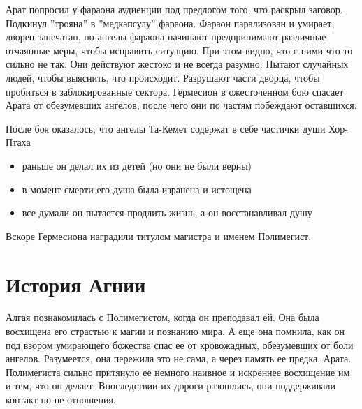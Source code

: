 \documentclass[12pt,a4paper]{article}
\begin{document}

Арат попросил у фараона аудиенции под предлогом того, что раскрыл заговор. Подкинул ''трояна'' в ''медкапсулу'' фараона. Фараон парализован и умирает, дворец запечатан, но ангелы фараона начинают предпринимают различные отчаянные меры, чтобы исправить ситуацию. При этом видно, что с ними что-то сильно не так. Они действуют жестоко и не всегда разумно. Пытают случайных людей, чтобы выяснить, что происходит. Разрушают части дворца, чтобы пробиться в заблокированные сектора. Гермесион в ожесточенном бою спасает Арата от обезумевших ангелов, после чего они по частям побеждают оставшихся.

После боя оказалось, что ангелы Та-Кемет содержат в себе частички души Хор-Птаха
\begin{itemize}
	\item раньше он делал их из детей (но они не были верны)
	\item в момент смерти его душа была изранена и истощена
	\item все думали он пытается продлить жизнь, а он восстанавливал душу
\end{itemize}

Вскоре Гермесиона наградили титулом магистра и именем Полимегист.


\section*{История Агнии}
Алгая познакомилась с Полимегистом, когда он преподавал ей. Она была восхищена его страстью к магии и познанию мира. А еще она помнила, как он под взором умирающего божества спас ее от кровожадных, обезумевших от боли ангелов. Разумеется, она пережила это не сама, а через память ее предка, Арата.
Полимегиста сильно притянуло ее немного наивное и искреннее восхищение им и тем, что он делает.
Впоследствии их дороги разошлись, они поддерживали контакт но не отношения.
\end{document}
